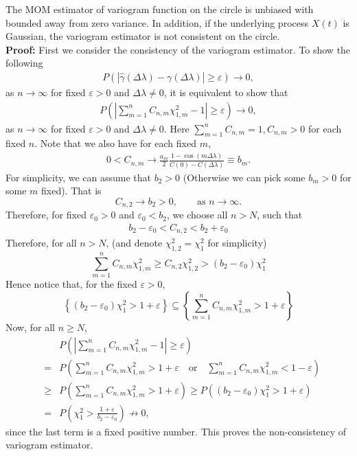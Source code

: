 \begin{prop}

The MOM estimator of variogram function on the circle is unbiased with bounded away from zero variance. In addition, if the underlying process $X(t)$ is Gaussian, the variogram estimator is not consistent on the circle. \\

{\bf Proof:} First we consider the consistency of the variogram estimator. To show the following
\begin{eqnarray*}
P\left( \left|\hat{\gamma}(\Delta \lambda) - \gamma(\Delta \lambda)\right| \ge \varepsilon\right) \to 0,
\end{eqnarray*}
as $n \to \infty$ for fixed $\varepsilon > 0$ and $\Delta \lambda \ne 0$, it is equivalent to show that
\begin{eqnarray*}
P\left( \left|\sum_{m = 1}^n C_{n, m} \chi_{1, m}^2 - 1 \right| \ge \varepsilon\right) \to 0,
\end{eqnarray*}
as $n \to \infty$ for fixed $\varepsilon > 0$ and $\Delta \lambda \ne 0$. Here $\sum_{m=1}^n C_{n, m} = 1, C_{n, m} > 0$ for each fixed $n$. Note that we also have for each fixed $m$,
\begin{eqnarray*}
0 < C_{n, m} \to \frac{a_m}{2}\frac{1 - \cos(m \Delta \lambda)}{C(0) - C(\Delta \lambda)} \equiv b_m.
\end{eqnarray*}
For simplicity, we can assume that $b_2 > 0$ (Otherwise we can pick some $b_m > 0$ for some $m$ fixed). That is
\[
C_{n, 2} \to b_2 > 0, \quad \quad \mbox{as $n \to \infty$}.
\]
Therefore, for fixed $\varepsilon_0 > 0$ and $\varepsilon_0 < b_2$, we choose all $n > N$, such that
\begin{eqnarray*}
b_2 - \varepsilon_0 < C_{n, 2} < b_2 + \varepsilon_0
\end{eqnarray*}
Therefore, for all $n > N$, (and denote $\chi_{1, 2}^2 = \chi_1^2$ for simplicity)
\[
\sum_{m = 1}^n C_{n, m}\chi_{1,m}^2  \ge  C_{n, 2} \chi_{1, 2}^2 > (b_2 - \varepsilon_0) \chi_1^2
\]
Hence notice that, for the fixed $\varepsilon > 0$,
\[
\left\{(b_2 - \varepsilon_0) \chi_{1}^2 > 1 + \varepsilon  \right\} \subseteq \left\{\sum_{m = 1}^n C_{n, m}\chi_{1,m}^2 > 1 + \varepsilon  \right\}
\]
Now, for all $n \ge N$,
\begin{eqnarray*}
& & P\left( \left|\sum_{m = 1}^n C_{n, m} \chi_{1, m}^2 - 1 \right| \ge \varepsilon\right) \\
&=& P\left( \sum_{m = 1}^n C_{n, m} \chi_{1, m}^2 > 1 + \varepsilon \quad \mbox{or} \quad  \sum_{m = 1}^n C_{n, m} \chi_{1, m}^2 < 1 - \varepsilon\right) \\
& \ge & P\left( \sum_{m = 1}^n C_{n, m} \chi_{1, m}^2 > 1 + \varepsilon \right)  \ge  P\left((b_2 - \varepsilon_0) \chi_{1}^2 > 1 + \varepsilon  \right) \\
& = & P\left(\chi_{1}^2 > \frac{1 + \varepsilon}{b_2 - \varepsilon_0}\right) \not\to 0,
\end{eqnarray*}
since the last term is a fixed positive number. This proves the non-consistency of variogram estimator.

\end{prop}


